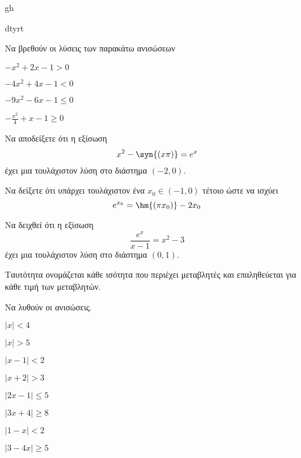 \documentclass[11pt,a4paper]{article}
\begin{document}
gh

dtyrt

Να βρεθούν οι λύσεις των παρακάτω ανισώσεων
\begin{multicols}{2}
\begin{alist}
\item $ -x^2+2x-1>0 $
\item $ -4x^2+4x-1<0 $
\item $ -9x^2-6x-1\leq 0 $
\item $ -\frac{x^2}{4}+x-1\geq 0 $
\end{alist}
\end{multicols}

Να αποδείξετε ότι η εξίσωση \[ x^2-\syn{(x\pi)}=e^x \] έχει μια τουλάχιστον λύση στο διάστημα $ (-2,0) $.

Να δείξετε ότι υπάρχει τουλάχιστον ένα $ x_0\in(-1,0) $ τέτοιο ώστε να ισχύει
\[ e^{x_0}=\hm{(\pi x_0)}-2x_0 \]

Να δειχθεί ότι η εξίσωση
\[ \frac{e^x}{x-1}=x^2-3 \]
έχει μια τουλάχιστον λύση στο διάστημα $ (0,1) $.

Ταυτότητα ονομάζεται κάθε ισότητα που περιέχει μεταβλητές και επαληθεύεται για κάθε τιμή των μεταβλητών.

Να λυθούν οι ανισώσεις.
\begin{multicols}{4}
\begin{alist}
\item $ \left|x\right|<4 $
\item $ \left|x\right|>5 $
\item $ \left|x-1\right|<2 $
\item $ \left|x+2\right|>3 $
\item $ \left|2x-1\right|\leq5 $
\item $ \left|3x+4\right|\geq8 $
\item $ \left|1-x\right|<2 $
\item $ \left|3-4x\right|\geq5 $
\end{alist}
\end{multicols}
\end{document}
